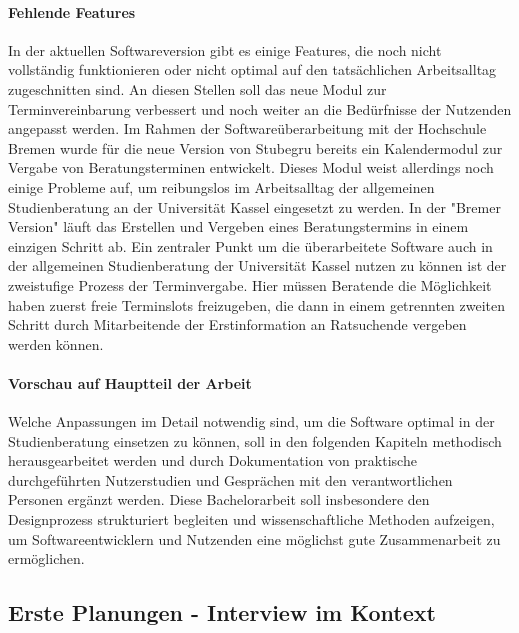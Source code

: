 \documentclass[12pt]{article}
\begin{document}
\paragraph{Fehlende Features}
In der aktuellen Softwareversion gibt es einige Features, die noch nicht
vollständig funktionieren oder nicht optimal auf den tatsächlichen
Arbeitsalltag zugeschnitten sind. An diesen Stellen soll das neue Modul zur
Terminvereinbarung verbessert und noch weiter an die Bedürfnisse der Nutzenden
angepasst werden. Im Rahmen der Softwareüberarbeitung mit der Hochschule Bremen
wurde für die neue Version von Stubegru bereits ein Kalendermodul zur Vergabe
von Beratungsterminen entwickelt. Dieses Modul weist allerdings noch einige
Probleme auf, um reibungslos im Arbeitsalltag der allgemeinen Studienberatung
an der Universität Kassel eingesetzt zu werden. In der "Bremer Version" läuft
das Erstellen und Vergeben eines Beratungstermins in einem einzigen Schritt ab.
Ein zentraler Punkt um die überarbeitete Software auch in der allgemeinen
Studienberatung der Universität Kassel nutzen zu können ist der zweistufige
Prozess der Terminvergabe. Hier müssen Beratende die Möglichkeit haben zuerst
freie Terminslots freizugeben, die dann in einem getrennten zweiten Schritt
durch Mitarbeitende der Erstinformation an Ratsuchende vergeben werden können.

\paragraph{Vorschau auf Hauptteil der Arbeit}
Welche Anpassungen im Detail notwendig sind, um die Software optimal in der
Studienberatung einsetzen zu können, soll in den folgenden Kapiteln methodisch
herausgearbeitet werden und durch Dokumentation von praktische durchgeführten
Nutzerstudien und Gesprächen mit den verantwortlichen Personen ergänzt werden.
Diese Bachelorarbeit soll insbesondere den Designprozess strukturiert begleiten
und wissenschaftliche Methoden aufzeigen, um Softwareentwicklern und Nutzenden
eine möglichst gute Zusammenarbeit zu ermöglichen.

\subsection{Erste Planungen - Interview im Kontext}
\end{document}
